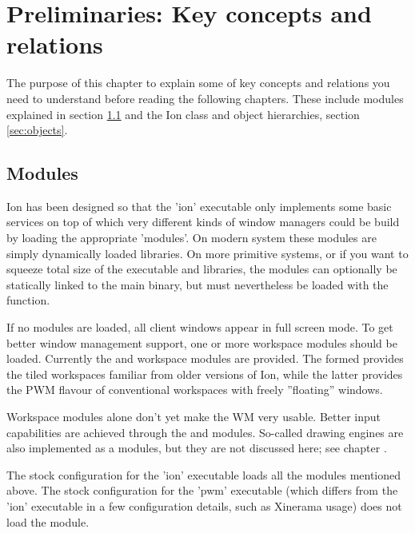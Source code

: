 
\chapter{Preliminaries: Key concepts and relations}
\label{chap:prelim}

The purpose of this chapter to explain some of key concepts and
relations you need to understand before reading the following
chapters. These include modules explained in section \ref{sec:modules}
and the Ion class and object hierarchies, section \ref{sec:objects}.


\section{Modules}
\label{sec:modules}

Ion has been designed so that the 'ion' executable only implements some
basic services on top of which very different kinds of window managers
could be build by loading the appropriate 'modules'. On modern system
these modules are simply dynamically loaded  libraries. On 
more primitive systems, or if you want to squeeze total size of the 
executable and libraries, the modules can optionally be statically 
linked to the main binary, but must nevertheless be loaded with the
 function.

If no modules are loaded, all client windows appear in full screen mode.
To get better window management support, one or more workspace modules
should be loaded. Currently the  and 
workspace modules are provided. The formed provides the tiled workspaces 
familiar from older versions of Ion, while the latter provides the PWM
flavour of conventional workspaces with freely ''floating'' windows.

Workspace modules alone don't yet make the WM very usable. Better
input capabilities are achieved through the  and 
modules. So-called drawing engines are also implemented as a modules,
but they are not discussed here; see chapter \label{chap:gr}.

The stock configuration for the 'ion' executable loads all the modules
mentioned above. The stock configuration for the 'pwm' executable (which
differs from the 'ion' executable in a few configuration details, such
as Xinerama usage) does not load the  module.


